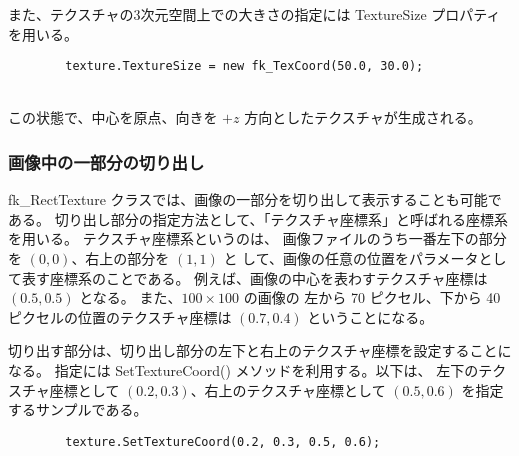 また、テクスチャの3次元空間上での大きさの指定には TextureSize プロパティを用いる。
\\
\begin{screen}
\begin{verbatim}
        texture.TextureSize = new fk_TexCoord(50.0, 30.0);
\end{verbatim}
\end{screen}
~ \\
この状態で、中心を原点、向きを \(+z\) 方向としたテクスチャが生成される。

\subsubsection{画像中の一部分の切り出し}
fk\_RectTexture クラスでは、画像の一部分を切り出して表示することも可能である。
切り出し部分の指定方法として、「テクスチャ座標系」と呼ばれる座標系を用いる。
テクスチャ座標系というのは、
画像ファイルのうち一番左下の部分を \((0, 0)\)、右上の部分を \((1, 1)\) と
して、画像の任意の位置をパラメータとして表す座標系のことである。
例えば、画像の中心を表わすテクスチャ座標は \((0.5, 0.5)\) となる。
また、\(100 \times 100\) の画像の
左から 70 ピクセル、下から 40 ピクセルの位置のテクスチャ座標は
\((0.7, 0.4)\) ということになる。

切り出す部分は、切り出し部分の左下と右上のテクスチャ座標を設定することになる。
指定には SetTextureCoord() メソッドを利用する。以下は、
左下のテクスチャ座標として \((0.2, 0.3)\)、右上のテクスチャ座標として
\((0.5, 0.6)\) を指定するサンプルである。
\\
\begin{screen}
\begin{verbatim}
        texture.SetTextureCoord(0.2, 0.3, 0.5, 0.6);
\end{verbatim}
\end{screen}

